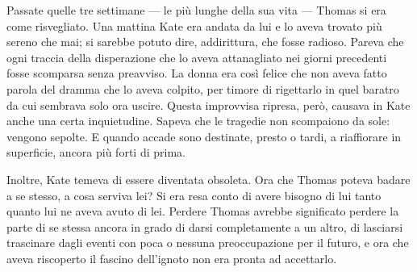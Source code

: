 \documentclass[a4paper,oneside,9pt]{memoir}
\begin{document}
Passate quelle tre settimane --- le più lunghe della sua vita --- Thomas si era come risvegliato. Una mattina Kate era
andata da lui e lo aveva trovato più sereno che mai; si sarebbe potuto dire, addirittura, che fosse radioso. Pareva che
ogni traccia della disperazione che lo aveva attanagliato nei giorni precedenti fosse scomparsa senza preavviso. La
donna era così felice che non aveva fatto parola del dramma che lo aveva colpito, per timore di rigettarlo in quel
baratro da cui sembrava solo ora uscire. Questa improvvisa ripresa, però, causava in Kate anche una certa inquietudine.
Sapeva che le tragedie non scompaiono da sole: vengono sepolte. E quando accade sono destinate, presto o tardi, a
riaffiorare in superficie, ancora più forti di prima.

Inoltre, Kate temeva di essere diventata obsoleta. Ora che Thomas poteva badare a se stesso, a cosa serviva lei? Si era
resa conto di avere bisogno di lui tanto quanto lui ne aveva avuto di lei. Perdere Thomas avrebbe significato perdere la
parte di se stessa ancora in grado di darsi completamente a un altro, di lasciarsi trascinare dagli eventi con poca o
nessuna preoccupazione per il futuro, e ora che aveva riscoperto il fascino dell'ignoto non era pronta ad accettarlo.
\end{document}
